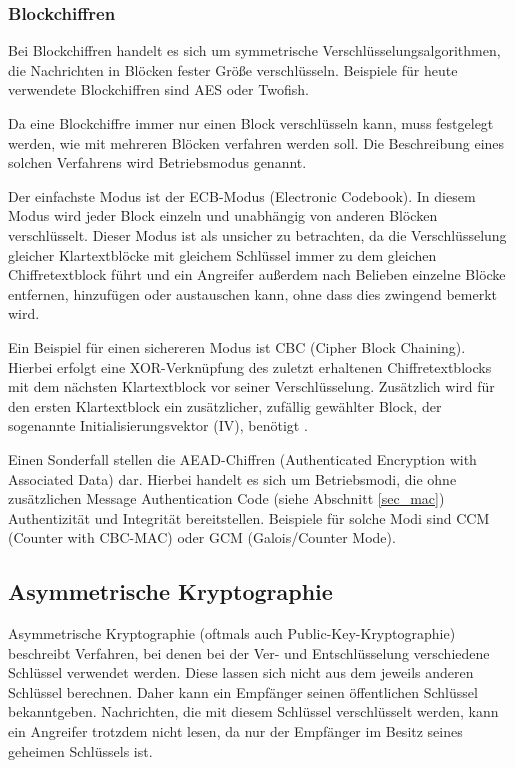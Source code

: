 \subsubsection{Blockchiffren}

Bei Blockchiffren handelt es sich um symmetrische Verschlüsselungsalgorithmen, die Nachrichten in Blöcken fester Größe verschlüsseln.  Beispiele für heute verwendete Blockchiffren sind AES oder Twofish.

Da eine Blockchiffre immer nur einen Block verschlüsseln kann, muss festgelegt werden, wie mit mehreren Blöcken verfahren werden soll. Die Beschreibung eines solchen Verfahrens wird Betriebsmodus genannt.

Der einfachste Modus ist der ECB-Modus (Electronic Codebook). In diesem Modus wird jeder Block einzeln und unabhängig von anderen Blöcken verschlüsselt. Dieser Modus ist als unsicher zu betrachten, da die Verschlüsselung gleicher Klartextblöcke mit gleichem Schlüssel immer zu dem gleichen Chiffretextblock führt und ein Angreifer außerdem nach Belieben einzelne Blöcke entfernen, hinzufügen oder austauschen kann, ohne dass dies zwingend bemerkt wird.

Ein Beispiel für einen sichereren Modus ist CBC (Cipher Block Chaining). Hierbei erfolgt eine XOR-Verknüpfung des zuletzt erhaltenen Chiffretextblocks mit dem nächsten Klartextblock vor seiner Verschlüsselung. Zusätzlich wird für den ersten Klartextblock ein zusätzlicher, zufällig gewählter Block, der sogenannte Initialisierungsvektor (IV), benötigt \cite{Schneier2006}.

Einen Sonderfall stellen die AEAD-Chiffren (Authenticated Encryption with Associated Data) dar. Hierbei handelt es sich um Betriebsmodi, die ohne zusätzlichen Message Authentication Code (siehe Abschnitt \ref{sec_mac}) Authentizität und Integrität bereitstellen. Beispiele für solche Modi sind CCM (Counter with CBC-MAC) oder GCM (Galois/Counter Mode). 

\subsection{Asymmetrische Kryptographie}

Asymmetrische Kryptographie (oftmals auch Public-Key-Kryptographie) beschreibt Verfahren, bei denen bei der Ver- und Entschlüsselung verschiedene Schlüssel verwendet werden. Diese lassen sich nicht aus dem jeweils anderen Schlüssel berechnen. Daher kann ein Empfänger seinen öffentlichen Schlüssel bekanntgeben. Nachrichten, die mit diesem Schlüssel verschlüsselt werden, kann ein Angreifer trotzdem nicht lesen, da nur der Empfänger im Besitz seines geheimen Schlüssels ist.

